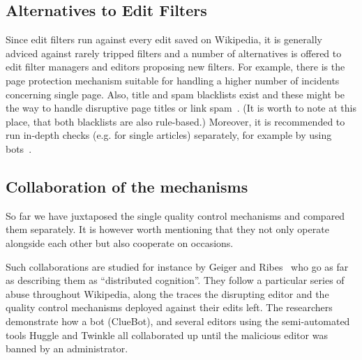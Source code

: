 \subsection{Alternatives to Edit Filters}

Since edit filters run against every edit saved on Wikipedia, it is generally adviced against rarely tripped filters and a number of alternatives is offered to edit filter managers and editors proposing new filters.
For example, there is the page protection mechanism suitable for handling a higher number of incidents concerning single page.
Also, title and spam blacklists exist and these might be the way to handle disruptive page titles or link spam~\cite{Wikipedia:EditFilter}.
(It is worth to note at this place, that both blacklists are also rule-based.)
Moreover, it is recommended to run in-depth checks (e.g. for single articles) separately, for example by using bots~\cite{Wikipedia:EditFilterRequested}.

\subsection{Collaboration of the mechanisms}
\label{subsection:collaboration-bots-filters}

So far we have juxtaposed the single quality control mechanisms and compared them separately.
It is however worth mentioning that they not only operate alongside each other but also cooperate on occasions.

Such collaborations are studied for instance by Geiger and Ribes~\cite{GeiRib2010} who go as far as describing them as ``distributed cognition''.
They follow a particular series of abuse throughout Wikipedia, along the traces the disrupting editor and the quality control mechanisms deployed against their edits left.
The researchers demonstrate how a bot (ClueBot), and several editors using the semi-automated tools Huggle and Twinkle all collaborated up until the malicious editor was banned by an administrator.


